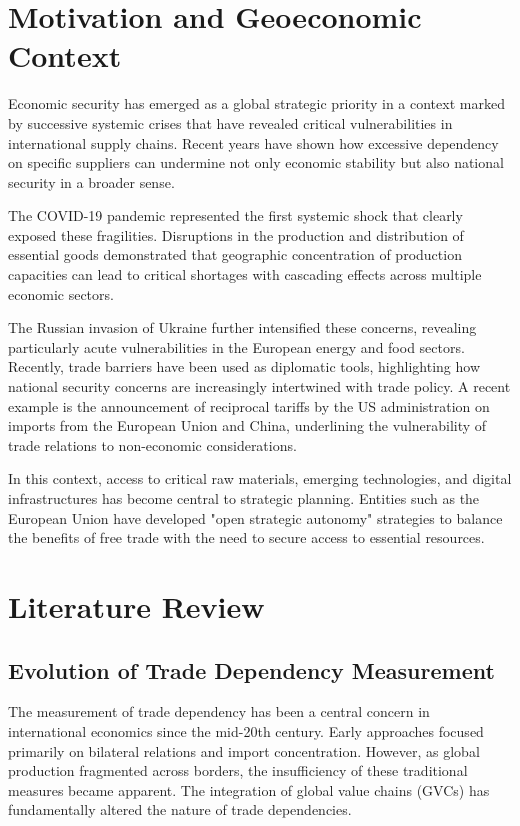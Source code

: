 \documentclass[final,1p,times,authoryear]{elsarticle}
\begin{document}
\section{Motivation and Geoeconomic Context}

Economic security has emerged as a global strategic priority in a context marked by successive systemic crises that have revealed critical vulnerabilities in international supply chains. Recent years have shown how excessive dependency on specific suppliers can undermine not only economic stability but also national security in a broader sense.

The COVID-19 pandemic represented the first systemic shock that clearly exposed these fragilities. Disruptions in the production and distribution of essential goods demonstrated that geographic concentration of production capacities can lead to critical shortages with cascading effects across multiple economic sectors.

The Russian invasion of Ukraine further intensified these concerns, revealing particularly acute vulnerabilities in the European energy and food sectors. Recently, trade barriers have been used as diplomatic tools, highlighting how national security concerns are increasingly intertwined with trade policy. A recent example is the announcement of reciprocal tariffs by the US administration on imports from the European Union and China, underlining the vulnerability of trade relations to non-economic considerations.

In this context, access to critical raw materials, emerging technologies, and digital infrastructures has become central to strategic planning. Entities such as the European Union have developed "open strategic autonomy" strategies to balance the benefits of free trade with the need to secure access to essential resources.

\section{Literature Review}

\subsection{Evolution of Trade Dependency Measurement}
The measurement of trade dependency has been a central concern in international economics since the mid-20th century. Early approaches focused primarily on bilateral relations and import concentration. However, as global production fragmented across borders, the insufficiency of these traditional measures became apparent. The integration of global value chains (GVCs) has fundamentally altered the nature of trade dependencies.
\end{document}
